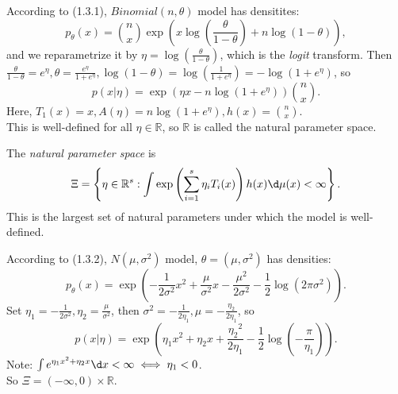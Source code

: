 \documentclass[a4paper]{article}
\begin{document}
\begin{eg}
	According to (1.3.1), $Binomial(n, \theta)$ model has densitites:
	\begin{equation*}
		p_\theta(x) = \binom{n}{x} \exp \left(x\log\left(\frac{\theta}{1 - \theta}\right) + n\log(1 - \theta)\right),
	\end{equation*}
	and we reparametrize it by $\eta = \log\left(\frac{\theta}{1 - \theta}\right)$, which is the \emph{logit} transform. Then $\frac{\theta}{1 - \theta} = e^{\eta}, \theta = \frac{e^{\eta}}{1+e^{\eta}}, \log(1-\theta) = \log\left(\frac{1}{1+e^{\eta}}\right) = -\log(1 + e^{\eta})$, so
	\begin{equation}
		p(x|\eta) = \exp (\eta x - n\log(1+e^{\eta}))\binom{n}{x}.
	\end{equation}
	Here, $T_1(x) = x, A(\eta) = n\log(1+e^{\eta}), h(x) = \binom{n}{x}.$\\
	This is well-defined for all $\eta \in \mathbb{R}$, so $\mathbb{R}$ is called the natural parameter space.
\end{eg}

\begin{defi}
	The \emph{natural parameter space} is 
	\begin{equation}
		\Xi = \left\{\eta \in \mathbb{R}^s: \int \exp \left(\sum\limits_{i = 1}^s \eta_i T_i (x)\right)h(x) \d \mu (x) < \infty\right\}.
	\end{equation}
	This is the largest set of natural parameters under which the model is well-defined.
\end{defi}

\begin{eg}
	According to (1.3.2), $N(\mu,{\sigma}^2)$ model, $\theta = (\mu, {\sigma}^2)$ has densities:
	\begin{equation*}
		p_\theta(x) = \exp\left(-\frac{1}{2{\sigma}^2} x^2 + \frac{\mu}{{\sigma}^2}x - \frac{{\mu}^2}{2 {\sigma}^2} - \frac{1}{2} \log (2 \pi {\sigma}^2)\right).
	\end{equation*}
	Set $\eta_1 = -\frac{1}{2{\sigma}^2}, \eta_2 = \frac{\mu}{{\sigma}^2}$, then ${\sigma}^2 = -\frac{1}{2\eta_1}, \mu = -\frac{\eta_2}{2\eta_1}$, so
	\begin{equation}
		p(x|\eta) = \exp \left(\eta_1 x^2 + \eta_2 x + \frac{{\eta_2}^2}{2\eta_1}-\frac{1}{2}\log\left(-\frac{\pi}{\eta_1}\right)\right).
	\end{equation}
	Note: $\int e^{\eta_1 x^2 + \eta_2 x} \d x < \infty \iff \eta_1 < 0$.\\
	So $\Xi = (-\infty,0) \times \mathbb{R}$.
\end{eg}
\end{document}

